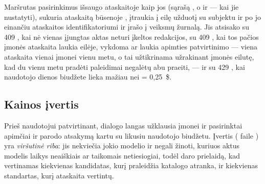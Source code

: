 Maršrutas pasirinkimus išsaugo ataskaitoje kaip jos  (sąrašą , o
 ir  --- kai jie nustatyti), sukuria ataskaitą būsenoje
, įtraukia į eilę užduotį  su subjektu  ir po jo
einančiu ataskaitos identifikatoriumi ir įrašo  į veiksmų žurnalą.
Jis atsisako su 409 , kai nė vienas įjungtas aktas neturi įkeltos redakcijos,
su 409 , kai tos pačios įmonės ataskaita laukia eilėje, vykdoma ar laukia
apimties patvirtinimo --- viena ataskaita vienai įmonei vienu metu, o tai užtikrinama
užrakinant įmonės eilutę, kad du vienu metu pradėti paleidimai negalėtų abu praeiti, --- ir su
429 , kai naudotojo dienos biudžete lieka mažiau nei
 = 0,25~\$.

\subsection{Kainos įvertis}\label{sec:report:estimate}

Prieš naudotojui patvirtinant, dialogo langas užklausia 
įmonei ir pasirinktai apimčiai ir parodo atsakymą kartu su likusiu naudotojo biudžetu. Įvertis
( faile ) yra \emph{viršutinė riba}: jis
nekviečia jokio modelio ir negali žinoti, kuriuos aktus modelis laikys neaiškiais ar taikomais
netiesiogiai, todėl daro prielaidą, kad vertinamas kiekvienas kandidatas, kurį praleidžia
katalogo atranka, ir kiekvienas standartas, kurį ataskaita vertintų.

